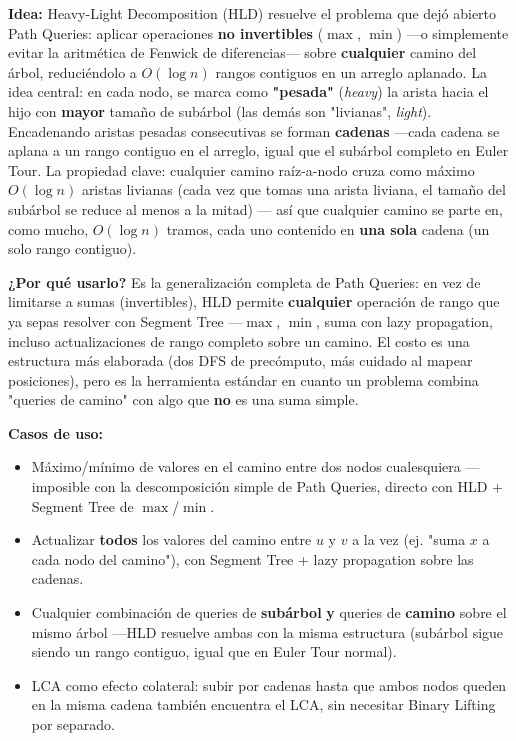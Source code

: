 \documentclass[10pt,a4paper,twocolumn]{article}
\begin{document}
\textbf{Idea:} Heavy-Light Decomposition (HLD) resuelve el problema
que dejó abierto Path Queries: aplicar operaciones \textbf{no
invertibles} ($\max$, $\min$) —o simplemente evitar la aritmética de
Fenwick de diferencias— sobre \textbf{cualquier} camino del árbol,
reduciéndolo a $O(\log n)$ rangos contiguos en un arreglo aplanado.
La idea central: en cada nodo, se marca como \textbf{"pesada"}
(\textit{heavy}) la arista hacia el hijo con \textbf{mayor} tamaño de
subárbol (las demás son "livianas", \textit{light}). Encadenando
aristas pesadas consecutivas se forman \textbf{cadenas} —cada cadena
se aplana a un rango contiguo en el arreglo, igual que el subárbol
completo en Euler Tour. La propiedad clave: cualquier camino
raíz-a-nodo cruza como máximo $O(\log n)$ aristas livianas (cada vez
que tomas una arista liviana, el tamaño del subárbol se reduce al
menos a la mitad) — así que cualquier camino se parte en, como mucho,
$O(\log n)$ tramos, cada uno contenido en \textbf{una sola} cadena
(un solo rango contiguo).

\textbf{¿Por qué usarlo?} Es la generalización completa de Path
Queries: en vez de limitarse a sumas (invertibles), HLD permite
\textbf{cualquier} operación de rango que ya sepas resolver con
Segment Tree —$\max$, $\min$, suma con lazy propagation, incluso
actualizaciones de rango completo sobre un camino. El costo es una
estructura más elaborada (dos DFS de precómputo, más cuidado al
mapear posiciones), pero es la herramienta estándar en cuanto un
problema combina "queries de camino" con algo que \textbf{no} es una
suma simple.

\textbf{Casos de uso:}

\begin{itemize}
    \item Máximo/mínimo de valores en el camino entre dos nodos
    cualesquiera —imposible con la descomposición simple de Path
    Queries, directo con HLD + Segment Tree de $\max$/$\min$.
    \item Actualizar \textbf{todos} los valores del camino entre $u$
    y $v$ a la vez (ej. "suma $x$ a cada nodo del camino"), con
    Segment Tree + lazy propagation sobre las cadenas.
    \item Cualquier combinación de queries de \textbf{subárbol}
    \textbf{y} queries de \textbf{camino} sobre el mismo árbol —HLD
    resuelve ambas con la misma estructura (subárbol sigue siendo un
    rango contiguo, igual que en Euler Tour normal).
    \item LCA como efecto colateral: subir por cadenas hasta que
    ambos nodos queden en la misma cadena también encuentra el LCA,
    sin necesitar Binary Lifting por separado.
\end{itemize}
\end{document}
